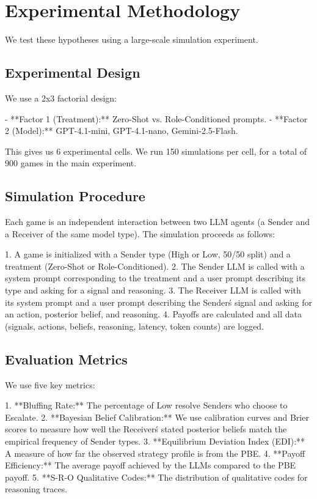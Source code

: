 \documentclass[12pt]{article}
\theoremstyle{plain}
\theoremstyle{definition}
\begin{document}
\section{Experimental Methodology}

We test these hypotheses using a large-scale simulation experiment.

\subsection{Experimental Design}

We use a 2x3 factorial design:

- **Factor 1 (Treatment):** Zero-Shot vs. Role-Conditioned prompts.
- **Factor 2 (Model):** GPT-4.1-mini, GPT-4.1-nano, Gemini-2.5-Flash.

This gives us 6 experimental cells. We run 150 simulations per cell, for a total of 900 games in the main experiment.

\subsection{Simulation Procedure}

Each game is an independent interaction between two LLM agents (a Sender and a Receiver of the same model type). The simulation proceeds as follows:

1.  A game is initialized with a Sender type (High or Low, 50/50 split) and a treatment (Zero-Shot or Role-Conditioned).
2.  The Sender LLM is called with a system prompt corresponding to the treatment and a user prompt describing its type and asking for a signal and reasoning.
3.  The Receiver LLM is called with its system prompt and a user prompt describing the Sender\'s signal and asking for an action, posterior belief, and reasoning.
4.  Payoffs are calculated and all data (signals, actions, beliefs, reasoning, latency, token counts) are logged.

\subsection{Evaluation Metrics}

We use five key metrics:

1.  **Bluffing Rate:** The percentage of Low resolve Senders who choose to Escalate.
2.  **Bayesian Belief Calibration:** We use calibration curves and Brier scores to measure how well the Receiver\'s stated posterior beliefs match the empirical frequency of Sender types.
3.  **Equilibrium Deviation Index (EDI):** A measure of how far the observed strategy profile is from the PBE.
4.  **Payoff Efficiency:** The average payoff achieved by the LLMs compared to the PBE payoff.
5.  **S-R-O Qualitative Codes:** The distribution of qualitative codes for reasoning traces.
\end{document}

